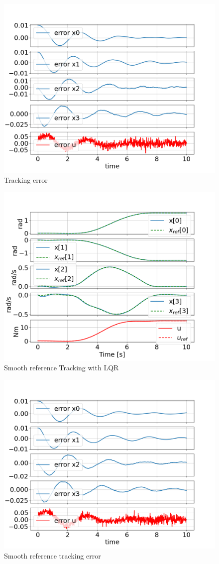 \begin{figure}
    \centering
    \includegraphics[width=0.8\linewidth]{figs/downward_lqr_error.png}
    \caption{Tracking error}
    \label{fig:downward_lqr_error}
\end{figure}

\begin{figure}
    \centering
    \includegraphics[width=0.8\linewidth]{figs/downward_lqr_error_smooth.png}
    \caption{Smooth reference Tracking with LQR}
    \label{fig:downward_lqr_track_smooth}
\end{figure}

\begin{figure}
    \centering
    \includegraphics[width=0.8\linewidth]{figs/downward_lqr_track_smooth.png}
    \caption{Smooth reference tracking error}
    \label{fig:downward_lqr_error_smooth}
\end{figure}


